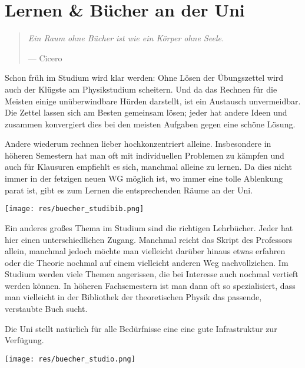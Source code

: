 \section{Lernen \& Bücher an der Uni}
\begin{multicols*}{2}
\begin{quote}
	\textit{Ein Raum ohne Bücher ist wie ein Körper ohne Seele.}
	
	\hfill--- Cicero
\end{quote}
Schon früh im Studium wird klar werden: Ohne Lösen der Übungszettel wird auch der Klügste am Physikstudium scheitern.
Und da das Rechnen für die Meisten einige unüberwindbare Hürden darstellt, ist ein Austausch unvermeidbar.
Die Zettel lassen sich am Besten gemeinsam lösen; jeder hat andere Ideen und zusammen konvergiert dies bei den meisten Aufgaben gegen eine schöne Lösung.

Andere wiederum rechnen lieber hochkonzentriert alleine.
Insbesondere in höheren Semestern hat man oft mit individuellen Problemen zu kämpfen und auch für Klausuren empfiehlt es sich, manchmal alleine zu lernen.
Da dies nicht immer in der fetzigen neuen WG möglich ist, wo immer eine tolle Ablenkung parat ist, gibt es zum Lernen die entsprechenden Räume an der Uni.

\texttt{[image: res/buecher\_studibib.png]}

Ein anderes großes Thema im Studium sind die richtigen Lehrbücher.
Jeder hat hier einen unterschiedlichen Zugang.
Manchmal reicht das Skript des Professors allein, manchmal jedoch möchte man vielleicht darüber hinaus etwas erfahren oder die Theorie nochmal auf einem vielleicht anderen Weg nachvollziehen.
Im Studium werden viele Themen angerissen, die bei Interesse auch nochmal vertieft werden können.
In höheren Fachsemestern ist man dann oft so spezialisiert, dass man vielleicht in der Bibliothek der theoretischen Physik das passende, verstaubte Buch sucht.

Die Uni stellt natürlich für alle Bedürfnisse eine eine gute Infrastruktur zur Verfügung.

\texttt{[image: res/buecher\_studio.png]}


\end{multicols*}
